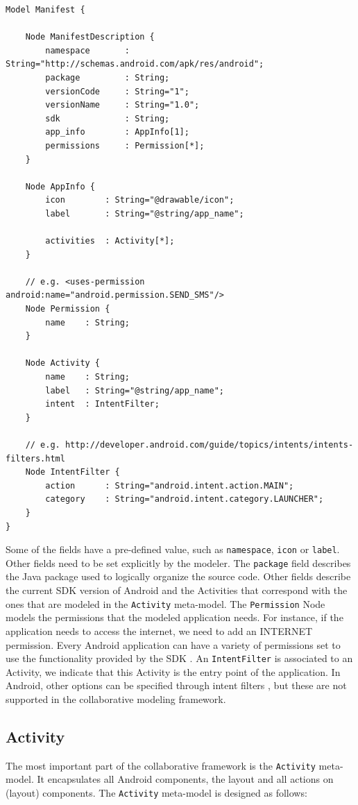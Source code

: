 \begin{lstlisting}[label=application-mm,caption=Manifest meta-model, captionpos=t]
Model Manifest {

	Node ManifestDescription {
		namespace		: String="http://schemas.android.com/apk/res/android";
		package			: String;
		versionCode		: String="1";
		versionName		: String="1.0";
		sdk				: String;
		app_info		: AppInfo[1];
		permissions		: Permission[*];
	}

	Node AppInfo {
		icon 		: String="@drawable/icon";
		label		: String="@string/app_name";

		activities	: Activity[*];
	}

	// e.g. <uses-permission android:name="android.permission.SEND_SMS"/>
	Node Permission {
		name 	: String;
	}

	Node Activity {
		name 	: String;
		label 	: String="@string/app_name";
		intent	: IntentFilter;
	}

	// e.g. http://developer.android.com/guide/topics/intents/intents-filters.html
	Node IntentFilter {
		action 		: String="android.intent.action.MAIN";
		category	: String="android.intent.category.LAUNCHER";
	}
}
\end{lstlisting}
Some of the fields have a pre-defined value, such as \texttt{namespace}, \texttt{icon} or \texttt{label}. Other fields need to be set explicitly by the modeler. The \texttt{package} field describes the Java package used to logically organize the source code. Other fields describe the current SDK version of Android and the Activities that correspond with the ones that are modeled in the \texttt{Activity} meta-model. The \texttt{Permission} Node models the permissions that the modeled application needs. For instance, if the application needs to access the internet, we need to add an INTERNET permission. Every Android application can have a variety of permissions set to use the functionality provided by the SDK \cite{AndroidPermissions}. An \texttt{IntentFilter} is associated to an Activity, we indicate that this Activity is the entry point of the application. In Android, other options can be specified through intent filters \cite{AndroidIntentFilter}, but these are not supported in the collaborative modeling framework.

\subsection{Activity}

The most important part of the collaborative framework is the \texttt{Activity} meta-model. It encapsulates all Android components, the layout and all actions on (layout) components. The \texttt{Activity} meta-model is designed as follows:

